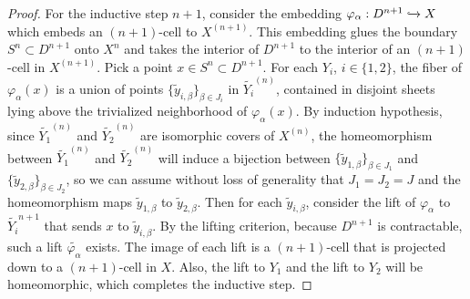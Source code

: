 \documentclass{article}
\begin{document}
\begin{enumerate}
\begin{enumerate}
\begin{proof}
        For the inductive step $n+1$, consider the embedding
        $\varphi_\alpha:D^{n+1}\xhookrightarrow{}X$ which embeds an
        $(n+1)$-cell to $X^{(n+1)}$. This embedding glues the boundary
        $S^n\subset D^{n+1}$ onto $X^n$ and takes the interior of $D^{n+1}$
        to the interior of an $(n+1)$-cell in $X^{(n+1)}$. Pick a point
        $x\in S^n\subset D^{n+1}$. For each $Y_i$, $i\in\{1,2\}$, the fiber
        of $\varphi_\alpha(x)$ is a union of points
        $\{\widetilde{y}_{i,\beta}\}_{\beta\in J_i}$ in
        $\widetilde{Y_i}^{(n)}$, contained in disjoint sheets lying above
        the trivialized neighborhood of $\varphi_\alpha(x)$. By induction
        hypothesis, since $\widetilde{Y_1}^{(n)}$ and
        $\widetilde{Y_2}^{(n)}$ are isomorphic covers of $X^{(n)}$, the
        homeomorphism between $\widetilde{Y_1}^{(n)}$ and
        $\widetilde{Y_2}^{(n)}$ will induce a bijection between
        $\{\widetilde{y}_{1,\beta}\}_{\beta\in J_1}$ and
        $\{\widetilde{y}_{2,\beta}\}_{\beta\in J_2}$, so we can assume
        without loss of generality that $J_1=J_2=J$ and the homeomorphism
        maps $\widetilde{y}_{1,\beta}$ to $\widetilde{y}_{2,\beta}$. Then
        for each $\widetilde{y}_{i,\beta}$, consider the lift of
        $\varphi_\alpha$ to $\widetilde{Y_i}^{n+1}$ that sends $x$ to
        $\widetilde{y}_{i,\beta}$. By the lifting criterion, because
        $D^{n+1}$ is contractable, such a lift
        $\widetilde{\varphi_\alpha}$ exists. The image of each lift is a
        $(n+1)$-cell that is projected down to a $(n+1)$-cell in $X$. Also,
        the lift to $Y_1$ and the lift to $Y_2$ will be homeomorphic, which
        completes the inductive step.
      \end{proof}
    \end{enumerate}
\end{enumerate}
\end{document}
